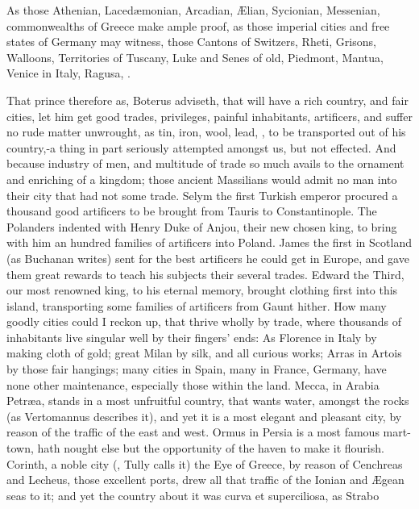 As those Athenian, Laced\ae{}monian, Arcadian, \AE{}lian, Sycionian,
Messenian, \etc{} commonwealths of Greece make ample proof, as those
imperial cities and free states of Germany may witness, those Cantons
of Switzers, Rheti, Grisons, Walloons, Territories of Tuscany, Luke and
Senes of old, Piedmont, Mantua, Venice in Italy, Ragusa, \etc{}.

That prince therefore as, Boterus adviseth, that will have a rich
country, and fair cities, let him get good trades, privileges, painful
inhabitants, artificers, and suffer no rude matter unwrought, as tin,
iron, wool, lead, \etc{}, to be transported out of his country,-a
thing in part seriously attempted amongst us, but not effected. And
because industry of men, and multitude of trade so much avails to the
ornament and enriching of a kingdom; those ancient Massilians
would admit no man into their city that had not some trade. Selym the
first Turkish emperor procured a thousand good artificers to be brought
from Tauris to Constantinople. The Polanders indented with Henry Duke
of Anjou, their new chosen king, to bring with him an hundred families
of artificers into Poland. James the first in Scotland (as
Buchanan writes) sent for the best artificers he could get in
Europe, and gave them great rewards to teach his subjects their several
trades. Edward the Third, our most renowned king, to his eternal
memory, brought clothing first into this island, transporting some
families of artificers from Gaunt hither. How many goodly cities could
I reckon up, that thrive wholly by trade, where thousands of
inhabitants live singular well by their fingers' ends: As Florence in
Italy by making cloth of gold; great Milan by silk, and all curious
works; Arras in Artois by those fair hangings; many cities in Spain,
many in France, Germany, have none other maintenance, especially those
within the land. Mecca, in Arabia Petr\ae{}a, stands in a most
unfruitful country, that wants water, amongst the rocks (as Vertomannus
describes it), and yet it is a most elegant and pleasant city, by
reason of the traffic of the east and west. Ormus in Persia is a most
famous mart-town, hath nought else but the opportunity of the haven to
make it flourish. Corinth, a noble city (, Tully calls it)
the Eye of Greece, by reason of Cenchreas and Lecheus, those excellent
ports, drew all that traffic of the Ionian and \AE{}gean seas to it; and
yet the country about it was curva et superciliosa, as Strabo
